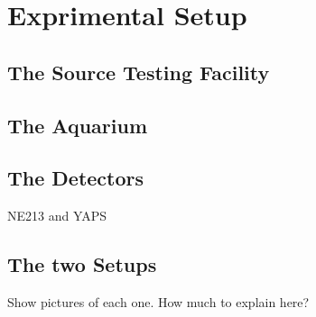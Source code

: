 \documentclass[main.tex]{subfiles}
\begin{document}
\section{Exprimental Setup}

\subsection{The Source Testing Facility}
\subsection{The Aquarium}
\subsection{The Detectors}
NE213 and YAPS
\subsection{The two Setups}
Show pictures of each one.
How much to explain here?
\end{document}
